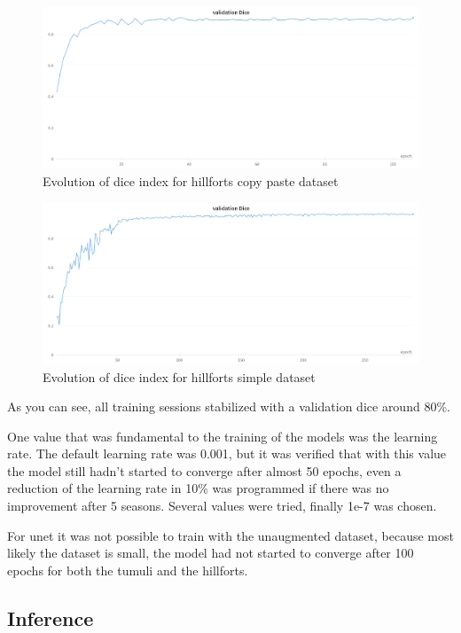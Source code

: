 \begin{figure}[H]
\centering
\includegraphics[width=12cm]{images/unet/castros_copy.png}
\caption{Evolution of dice index for hillforts copy paste dataset}
\end{figure}

\begin{figure}[H]
\centering
\includegraphics[width=12cm]{images/unet/castros_simple.png}
\caption{Evolution of dice index for hillforts simple dataset}
\end{figure}

As you can see, all training sessions stabilized with a validation dice around 80\%.

One value that was fundamental to the training of the models was the learning rate. The default learning rate was 0.001, but it was verified that with this value the model still hadn't started to converge after almost 50 epochs, even a reduction of the learning rate in 10\% was programmed if there was no improvement after 5 seasons. Several values were tried, finally 1e-7 was chosen.

For unet it was not possible to train with the unaugmented dataset, because most likely the dataset is small, the model had not started to converge after 100 epochs for both the tumuli and the hillforts.


\subsection{Inference}

